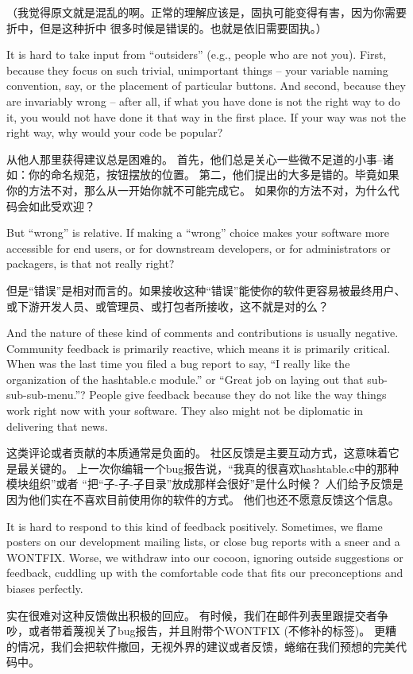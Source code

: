 （我觉得原文就是混乱的啊。正常的理解应该是，固执可能变得有害，因为你需要折中，但是这种折中
很多时候是错误的。也就是依旧需要固执。）

It is hard to take input from ``outsiders'' (e.g., people who are not you). First, because they focus on such trivial, unimportant things -- your variable naming convention, say, or the placement of particular buttons. And second, because they are invariably wrong -- after all, if what you have done is not the right way to do it, you would not have done it that way in the first place. If your way was not the right way, why would your code be popular?

从他人那里获得建议总是困难的。
首先，他们总是关心一些微不足道的小事--诸如：你的命名规范，按钮摆放的位置。
第二，他们提出的大多是错的。毕竟如果你的方法不对，那么从一开始你就不可能完成它。
如果你的方法不对，为什么代码会如此受欢迎？

But ``wrong'' is relative. If making a ``wrong'' choice makes your software more
accessible for end users, or for downstream developers, or for administrators or
packagers, is that not really right?

但是``错误''是相对而言的。如果接收这种``错误''能使你的软件更容易被最终用户、
或下游开发人员、或管理员、或打包者所接收，这不就是对的么？

And the nature of these kind of comments and contributions is usually negative.
Community feedback is primarily reactive, which means it is primarily critical.
When was the last time you filed a bug report to say, ``I really like the
organization of the hashtable.c module.'' or ``Great job on laying out that
sub-sub-sub-menu.''? People give feedback because they do not like the way things work right now with your software. They also might not be diplomatic in
delivering that news.

这类评论或者贡献的本质通常是负面的。
社区反馈是主要互动方式，这意味着它是最关键的。
上一次你编辑一个bug报告说，``我真的很喜欢hashtable.c中的那种模块组织''或者
``把“子-子-子目录”放成那样会很好''是什么时候？
人们给予反馈是因为他们实在不喜欢目前使用你的软件的方式。
他们也还不愿意反馈这个信息。

It is hard to respond to this kind of feedback positively. Sometimes, we flame
posters on our development mailing lists, or close bug reports with a sneer and
a WONTFIX. Worse, we withdraw into our cocoon, ignoring outside suggestions or
feedback, cuddling up with the comfortable code that fits our preconceptions and
biases perfectly.

实在很难对这种反馈做出积极的回应。
有时候，我们在邮件列表里跟提交者争吵，或者带着蔑视关了bug报告，并且附带个WONTFIX
(不修补的标签)。
更糟的情况，我们会把软件撤回，无视外界的建议或者反馈，蜷缩在我们预想的完美代码中。

